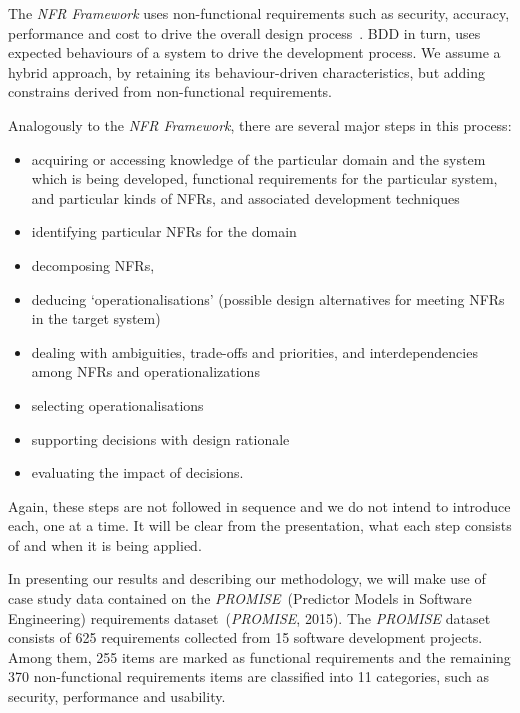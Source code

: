 \documentclass[dissertation,final]{softeng}
\begin{document}
The \emph{NFR Framework} uses non-functional requirements such as security, accuracy, performance and cost to drive the overall design process~\citep{Chung2000}. BDD in turn, uses expected behaviours of a system to drive the development process. We assume a hybrid approach, by retaining its behaviour-driven characteristics, but adding constrains derived from non-functional requirements.
\clearpage

Analogously to the \emph{NFR Framework}, there are several major steps in this process:
\begin{itemize}
\item acquiring or accessing knowledge of the particular domain and the system which is being developed, functional requirements for the particular system, and particular kinds of NFRs, and associated development techniques
\item identifying particular NFRs for the domain
\item decomposing NFRs,
\item deducing `operationalisations' (possible design alternatives for meeting NFRs in the target system)
\item dealing with ambiguities, trade-offs and priorities, and interdependencies among NFRs and operationalizations
\item selecting operationalisations
\item supporting decisions with design rationale
\item evaluating the impact of decisions.
\end{itemize}

Again, these steps are not followed in sequence and we do not intend to introduce each, one at a time. It will be clear from the presentation, what each step consists of and when it is being applied.

In presenting our results and describing our methodology, we will make use of case study data contained on the \emph{PROMISE}~(Predictor Models in Software Engineering) requirements dataset~(\emph{PROMISE}, 2015). The \emph{PROMISE} dataset consists of 625 requirements collected from 15 software development projects. Among them, 255 items are marked as functional requirements and the remaining 370 non-functional requirements items are classified into 11 categories, such as security, performance and usability.
\end{document}
